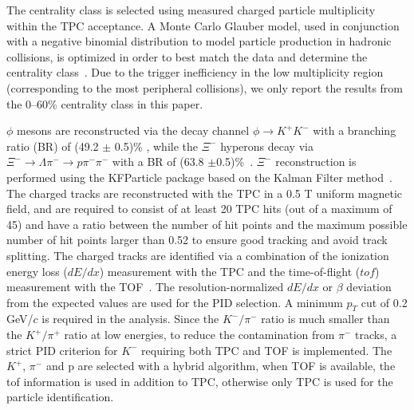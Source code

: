 \documentclass[aps,tightenlines,superscriptaddress,twocolumn]{revtex4-1}
\begin{document}
The centrality class is selected using measured charged particle multiplicity within the TPC acceptance. 
A Monte Carlo Glauber model, used in conjunction with a negative binomial distribution to model particle production in hadronic collisions, is optimized in order to best match the data and determine the centrality class~\cite{MC_Ray_2008,STAR:2021fge}. Due to the trigger inefficiency in the low multiplicity region (corresponding to the most peripheral collisions), we only report the results from the 0--60\% %
centrality class in this paper.

$\phi$ mesons are reconstructed via the decay channel $\phi\rightarrow K^+K^-$ with a branching ratio (BR) of (49.2 $\pm$ 0.5)\% , while the $\Xi^{-}$ hyperons decay via $\Xi^-\rightarrow \Lambda\pi^-\rightarrow p\pi^-\pi^-$ with a BR of (63.8 $\pm $0.5)\%~\cite{pdg:2020}. $\Xi^-$ reconstruction is performed using the KFParticle package based on the Kalman Filter method~\cite{Kisel:2018nvd,Kisel:2020lpa,STAR:2021gvx,STAR_PRL_Xi_Oemga_polarization:2021}. The charged tracks are reconstructed with the TPC in a 0.5 T uniform magnetic field, and are required to consist of at least 20 TPC hits (out of a maximum of 45) and have a ratio between the number of hit points and the maximum possible number of hit points larger than 0.52 to ensure good tracking and avoid track splitting. %
The charged tracks are identified via a combination of the ionization energy loss ($dE/dx$) measurement with the TPC and the time-of-flight ($tof$) measurement with the TOF~\cite{Shao:2005iu,Xu:2008th}. 
The resolution-normalized $dE/dx$ or $\beta$ deviation from the expected values are used for the PID selection. 
A minimum $p_T$ cut of 0.2 GeV/$c$ is required in the analysis.
Since the $K^{-}/\pi^{-}$ ratio is much smaller than the $K^{+}/\pi^{+}$ ratio at low energies, to reduce the contamination from $\pi^{-}$ tracks, a strict PID criterion for $K^{-}$ requiring both TPC and TOF is implemented. The $K^{+}$, $\pi^{-}$ and p are selected with a hybrid algorithm, when TOF is available, the tof information is used in addition to TPC, otherwise only TPC is used for the particle identification.   
\end{document}
